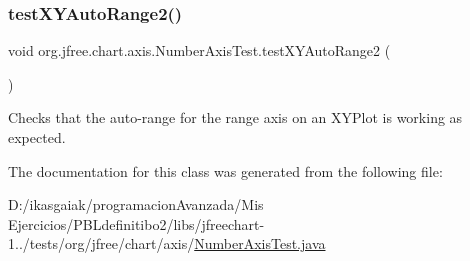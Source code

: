 \subsubsection{\texorpdfstring{test\+X\+Y\+Auto\+Range2()}{testXYAutoRange2()}}
{\footnotesize\ttfamily void org.\+jfree.\+chart.\+axis.\+Number\+Axis\+Test.\+test\+X\+Y\+Auto\+Range2 (\begin{DoxyParamCaption}{ }\end{DoxyParamCaption})}

Checks that the auto-\/range for the range axis on an X\+Y\+Plot is working as expected. 

The documentation for this class was generated from the following file\+:\begin{DoxyCompactItemize}
\item 
D\+:/ikasgaiak/programacion\+Avanzada/\+Mis Ejercicios/\+P\+B\+Ldefinitibo2/libs/jfreechart-\/1../tests/org/jfree/chart/axis/\mbox{\hyperlink{_number_axis_test_8java}{Number\+Axis\+Test.\+java}}\end{DoxyCompactItemize}
